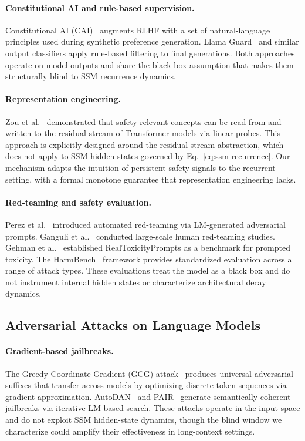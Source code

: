 \documentclass{article}
\newcommand{\MBCA}{\mathrm{MBCA}}
\begin{document}
\paragraph{Constitutional AI and rule-based supervision.}
Constitutional AI (CAI)~\cite{bai2022constitutional} augments RLHF with a set
of natural-language principles used during synthetic preference generation.
Llama Guard~\cite{inan2023llama} and similar output classifiers apply
rule-based filtering to final generations.  Both approaches operate on model
outputs and share the black-box assumption that makes them structurally blind
to SSM recurrence dynamics.

\paragraph{Representation engineering.}
Zou et al.~\cite{zou2023representation} demonstrated that safety-relevant
concepts can be read from and written to the residual stream of Transformer
models via linear probes.  This approach is explicitly designed around the
residual stream abstraction, which does not apply to SSM hidden states governed
by Eq.~\eqref{eq:ssm-recurrence}.  Our \MBCA{} mechanism adapts the intuition
of persistent safety signals to the recurrent setting, with a formal monotone
guarantee that representation engineering lacks.

\paragraph{Red-teaming and safety evaluation.}
Perez et al.~\cite{perez2022red} introduced automated red-teaming via
LM-generated adversarial prompts.  Ganguli et al.~\cite{ganguli2022red}
conducted large-scale human red-teaming studies.  Gehman et al.~\cite{gehman2020realtoxicity}
established RealToxicityPrompts as a benchmark for prompted toxicity.
The HarmBench~\cite{mazeika2024harmbench} framework provides standardized
evaluation across a range of attack types.  These evaluations treat the model
as a black box and do not instrument internal hidden states or characterize
architectural decay dynamics.

\subsection{Adversarial Attacks on Language Models}

\paragraph{Gradient-based jailbreaks.}
The Greedy Coordinate Gradient (GCG) attack~\cite{zou2023universal} produces
universal adversarial suffixes that transfer across models by optimizing
discrete token sequences via gradient approximation.  AutoDAN~\cite{liu2024autodan}
and PAIR~\cite{chao2023pair} generate semantically coherent jailbreaks via
iterative LM-based search.  These attacks operate in the input space and do not
exploit SSM hidden-state dynamics, though the blind window we characterize
could amplify their effectiveness in long-context settings.
\end{document}
